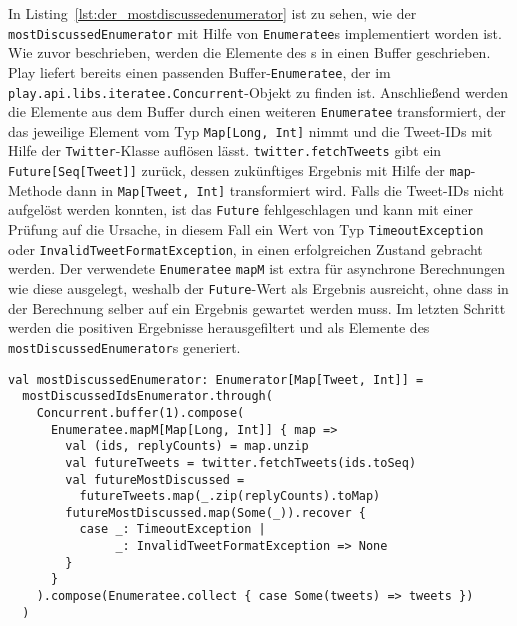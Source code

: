 In Listing~\ref{lst:der_mostdiscussedenumerator} ist zu sehen, wie der \lstinline|mostDiscussedEnumerator| mit Hilfe von \lstinline|Enumeratee|s implementiert worden ist.
Wie zuvor beschrieben, werden die Elemente des s in einen Buffer geschrieben.
Play liefert bereits einen passenden Buffer-\lstinline|Enumeratee|, der im \lstinline|play.api.libs.iteratee.Concurrent|-Objekt zu finden ist.
Anschließend werden die Elemente aus dem Buffer durch einen weiteren \lstinline|Enumeratee| transformiert, der das jeweilige Element vom Typ \lstinline|Map[Long, Int]| nimmt und die Tweet-IDs mit Hilfe der \lstinline|Twitter|-Klasse auflösen lässt.
\lstinline|twitter.fetchTweets| gibt ein \lstinline|Future[Seq[Tweet]]| zurück, dessen zukünftiges Ergebnis mit Hilfe der \lstinline|map|-Methode dann in \lstinline|Map[Tweet, Int]| transformiert wird.
Falls die Tweet-IDs nicht aufgelöst werden konnten, ist das \lstinline|Future| fehlgeschlagen und kann mit einer Prüfung auf die Ursache, in diesem Fall ein Wert von Typ \lstinline|TimeoutException| oder \lstinline|InvalidTweetFormatException|, in einen erfolgreichen Zustand gebracht werden.
Der verwendete \lstinline|Enumeratee| \lstinline|mapM| ist extra für asynchrone Berechnungen wie diese ausgelegt, weshalb der \lstinline|Future|-Wert als Ergebnis ausreicht, ohne dass in der Berechnung selber auf ein Ergebnis gewartet werden muss.
Im letzten Schritt werden die positiven Ergebnisse herausgefiltert und als Elemente des \lstinline|mostDiscussedEnumerator|s generiert.

\begin{lstlisting}[caption=Der mostDiscussedEnumerator, label=lst:der_mostdiscussedenumerator]
val mostDiscussedEnumerator: Enumerator[Map[Tweet, Int]] =
  mostDiscussedIdsEnumerator.through(
    Concurrent.buffer(1).compose(
      Enumeratee.mapM[Map[Long, Int]] { map =>
        val (ids, replyCounts) = map.unzip
        val futureTweets = twitter.fetchTweets(ids.toSeq)
        val futureMostDiscussed =
          futureTweets.map(_.zip(replyCounts).toMap)
        futureMostDiscussed.map(Some(_)).recover {
          case _: TimeoutException |
               _: InvalidTweetFormatException => None
        }
      }
    ).compose(Enumeratee.collect { case Some(tweets) => tweets })
  )
\end{lstlisting}



